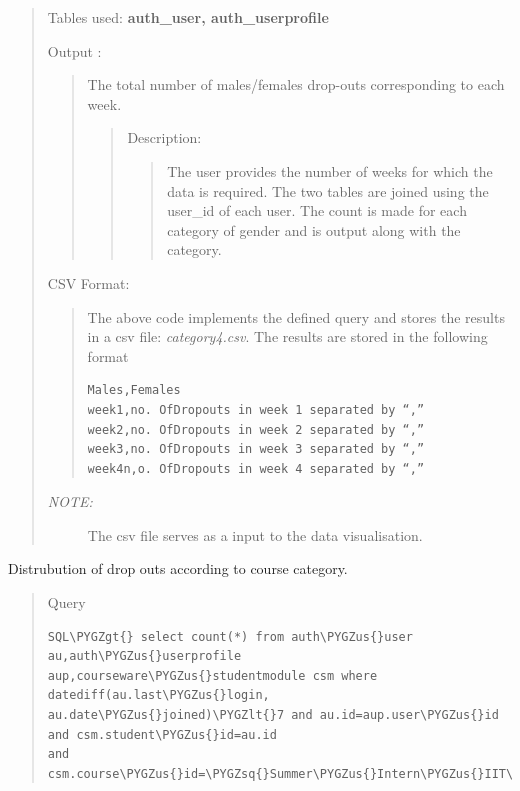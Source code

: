 \documentclass[a4paper,12pt,oneside]{sphinxmanual}
\def\PYGZus{\char`\_}
\def\PYGZlt{\char`\<}
\def\PYGZgt{\char`\>}
\def\PYGZsq{\char`\'}
\begin{document}
\begin{itemize}
\begin{quote}
Tables used: \textbf{auth\_user, auth\_userprofile}

Output :
\begin{quote}

The total number of males/females drop-outs corresponding to each week.
\begin{quote}

Description:
\begin{quote}

The user provides the number of weeks for which the data is required.
The two tables are joined using the user\_id of each user.
The count is made for each category of gender and is output along with the category.
\end{quote}
\end{quote}
\end{quote}

CSV Format:
\begin{quote}

The above code implements the defined query and stores the results in a csv file: \emph{category4.csv}.
The results are stored in the following format

\begin{Verbatim}[commandchars=\\\{\}]
Males,Females
week1,no. OfDropouts in week 1 separated by “,”
week2,no. OfDropouts in week 2 separated by “,”
week3,no. OfDropouts in week 3 separated by “,”
week4n,o. OfDropouts in week 4 separated by “,”
\end{Verbatim}
\end{quote}
\begin{description}
\item[{\emph{NOTE:}}] \leavevmode
The csv file serves as a input to the data visualisation.

\end{description}
\end{quote}

Distrubution of drop outs according to course category.
\begin{quote}

Query

\begin{Verbatim}[commandchars=\\\{\}]
SQL\PYGZgt{} select count(*) from auth\PYGZus{}user au,auth\PYGZus{}userprofile
aup,courseware\PYGZus{}studentmodule csm where datediff(au.last\PYGZus{}login,
au.date\PYGZus{}joined)\PYGZlt{}7 and au.id=aup.user\PYGZus{}id and csm.student\PYGZus{}id=au.id
and csm.course\PYGZus{}id=\PYGZsq{}Summer\PYGZus{}Intern\PYGZus{}IIT\PYGZus{}Mumbai/SI001/2014\PYGZus{}SI\PYGZus{}May\PYGZsq{};
\end{Verbatim}


\end{quote}
\end{itemize}
\end{document}
